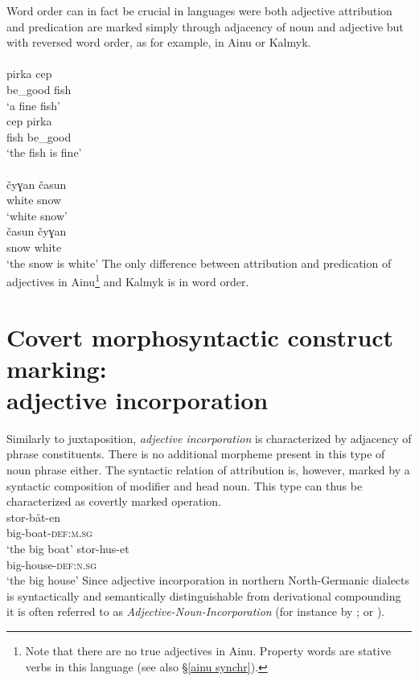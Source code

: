 Word order can in fact be crucial in languages were both adjective attribution and predication are marked simply through adjacency of noun and adjective but with reversed word order, as for example, in Ainu or Kalmyk. 
\ea
{}\\
\\
\gll	pirka cep\\
	be\_good fish\\
\glt	‘a fine fish’
\\
\gll	cep pirka\\
	fish be\_good\\
\glt	‘the fish is fine’
\z
\z
\ea
{}\\
\\
\gll	čyɣan časun\\
	white snow\\
\glt	‘white snow’
\\
\gll	časun čyɣan\\
	snow white\\
\glt	‘the snow is white’
\z
\z
The only difference between attribution and predication of adjectives in Ainu\footnote{Note that there are no true adjectives in Ainu. Property words are stative verbs in this language (see also \S\ref{ainu synchr}).} and Kalmyk is in word order. 
		
\section[Incorporation]{Covert morphosyntactic construct marking:\\adjective incorporation} \label{attr incorporation}

Similarly to juxtaposition, \emph{adjective incorporation} is characterized by adjacency of phrase constituents. There is no additional morpheme present in this type of noun phrase either. The syntactic relation of attribution is, however, marked by a syntactic composition of modifier and head noun. This type can thus be characterized as covertly marked operation.
\ea  \label{bondska compound}
\\
\ea
\gll 	stor-båt-en\\	
	big-boat-\textsc{def:m.sg}\\
\glt	‘the big boat’
\ex
\gll 	stor-hus-et\\
	big-house-\textsc{def:n.sg}\\
\glt	‘the big house’
\z
\z
Since adjective incorporation in northern North-Germanic dialects is syntactically and semantically distinguishable from derivational compounding it is often referred to as \emph{Adjective-Noun-Incorporation} (for instance by \citealt{sandstrom-etal2003}; \citealt[119–124]{dahl2007} or \citealt[61]{julien2005}).

